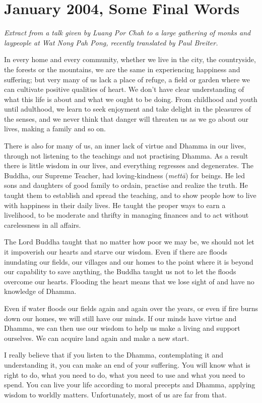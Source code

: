 \chapter{January 2004, Some Final Words}

\emph{Extract from a talk given by Luang Por Chah to a large gathering
of monks and laypeople at Wat Nong Pah Pong, recently translated by Paul
Breiter.}

In every home and every community, whether we live in the city, the
countryside, the forests or the mountains, we are the same in
experiencing happiness and suffering; but very many of us lack a place
of refuge, a field or garden where we can cultivate positive qualities
of heart. We don't have clear understanding of what this life is about
and what we ought to be doing. From childhood and youth until adulthood, 
we learn to seek enjoyment and take delight in the pleasures of the
senses, and we never think that danger will threaten us as we go about
our lives, making a family and so on. 

There is also for many of us, an inner lack of virtue and Dhamma in our
lives, through not listening to the teachings and not practising Dhamma. 
As a result there is little wisdom in our lives, and everything
regresses and degenerates. The Buddha, our Supreme Teacher, had
loving-kindness (\emph{mettā}) for beings. He led sons and daughters of
good family to ordain, practise and realize the truth. He taught them to
establish and spread the teaching, and to show people how to live with
happiness in their daily lives. He taught the proper ways to earn a
livelihood, to be moderate and thrifty in managing finances and to act
without carelessness in all affairs. 

The Lord Buddha taught that no matter how poor we may be, we should not
let it impoverish our hearts and starve our wisdom. Even if there are
floods inundating our fields, our villages and our homes to the point
where it is beyond our capability to save anything, the Buddha taught us
not to let the floods overcome our hearts. Flooding the heart means that
we lose sight of and have no knowledge of Dhamma. 

Even if water floods our fields again and again over the years, or even
if fire burns down our homes, we will still have our minds. If our minds
have virtue and Dhamma, we can then use our wisdom to help us make a
living and support ourselves. We can acquire land again and make a new
start. 

I really believe that if you listen to the Dhamma, contemplating it and
understanding it, you can make an end of your suffering. You will know
what is right to do, what you need to do, what you need to use and what
you need to spend. You can live your life according to moral precepts
and Dhamma, applying wisdom to worldly matters. Unfortunately, most of
us are far from that. 

